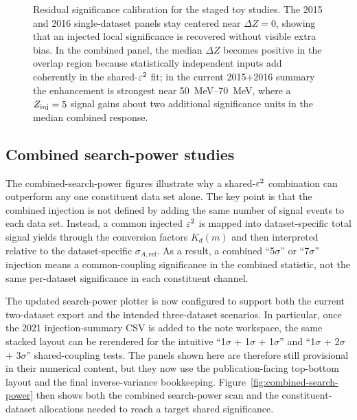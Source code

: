\begin{figure}[H]
\centering
{}
\caption{Residual significance calibration for the staged toy studies. The 2015 and
2016 single-dataset panels stay centered near $\Delta Z=0$, showing that an injected
local significance is recovered without visible extra bias. In the combined panel, the
median $\Delta Z$ becomes positive in the overlap region because statistically
independent inputs add coherently in the shared-$\varepsilon^2$ fit; in the current
2015+2016 summary the enhancement is strongest near \SIrange{50}{70}{MeV}, where a
$Z_{\rm inj}=5$ signal gains about two additional significance units in the median
combined response.}
\label{fig:z-calibration-residual}
\end{figure}

\subsection{Combined search-power studies}

The combined-search-power figures illustrate why a shared-$\varepsilon^2$ combination can
outperform any one constituent data set alone. The key point is that the combined
injection is not defined by adding the same number of signal events to each data set.
Instead, a common injected $\varepsilon^2$ is mapped into dataset-specific total signal yields
through the conversion factors $K_d(m)$ and then interpreted relative to the
dataset-specific $\sigma_{A,\mathrm{ref}}$. As a result, a combined ``5$\sigma$'' or
``7$\sigma$'' injection means a common-coupling significance in the combined statistic,
not the same per-dataset significance in each constituent channel.

The updated search-power plotter is now configured to support both the current
two-dataset export and the intended three-dataset scenarios. In particular, once the
2021 injection-summary CSV is added to the note workspace, the same stacked layout can
be rerendered for the intuitive ``1$\sigma$ + 1$\sigma$ + 1$\sigma$'' and
``1$\sigma$ + 2$\sigma$ + 3$\sigma$'' shared-coupling tests. The panels shown
here are therefore still provisional in their numerical content, but they now use the
publication-facing top-bottom layout and the final inverse-variance bookkeeping.
Figure~\ref{fig:combined-search-power} then shows both the combined search-power scan
and the constituent-dataset allocations needed to reach a target shared significance.

